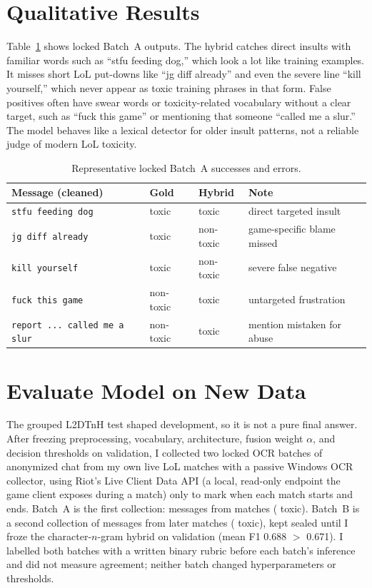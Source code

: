 \section*{Qualitative Results}

Table~\ref{tab:qual} shows locked Batch~A outputs. The hybrid catches direct insults with familiar words such as ``stfu feeding dog,'' which look a lot like training examples. It misses short LoL put-downs like ``jg diff already'' and even the severe line ``kill yourself,'' which never appear as toxic training phrases in that form. False positives often have swear words or toxicity-related vocabulary without a clear target, such as ``fuck this game'' or mentioning that someone ``called me a slur.'' The model behaves like a lexical detector for older insult patterns, not a reliable judge of modern LoL toxicity.

\begin{table}[!ht]
\centering
\small
\setlength{\tabcolsep}{4pt}
\begin{tabular}{llll}
\toprule
Message (cleaned) & Gold & Hybrid & Note \\
\midrule
\texttt{stfu feeding dog} & toxic & toxic & direct targeted insult \\
\texttt{jg diff already} & toxic & non-toxic & game-specific blame missed \\
\texttt{kill yourself} & toxic & non-toxic & severe false negative \\
\texttt{fuck this game} & non-toxic & toxic & untargeted frustration \\
\texttt{report ... called me a slur} & non-toxic & toxic & mention mistaken for abuse \\
\bottomrule
\end{tabular}
\caption{Representative locked Batch~A successes and errors.}
\label{tab:qual}
\end{table}

\section*{Evaluate Model on New Data}

The grouped L2DTnH test shaped development, so it is not a pure final answer. After freezing preprocessing, vocabulary, architecture, fusion weight $\alpha$, and decision thresholds on validation, I collected two locked OCR batches of anonymized chat from my own live LoL matches with a passive Windows OCR collector, using Riot's Live Client Data API (a local, read-only endpoint the game client exposes during a match) only to mark when each match starts and ends. Batch~A is the first collection: \FreshMessages{} messages from \FreshMatches{} matches (\FreshToxic{} toxic). Batch~B is a second collection of \BatchBMessages{} messages from \BatchBMatches{} later matches (\BatchBToxic{} toxic), kept sealed until I froze the character-$n$-gram hybrid on validation (mean F1 0.688 $>$ 0.671). I labelled both batches with a written binary rubric before each batch's inference and did not measure agreement; neither batch changed hyperparameters or thresholds.

